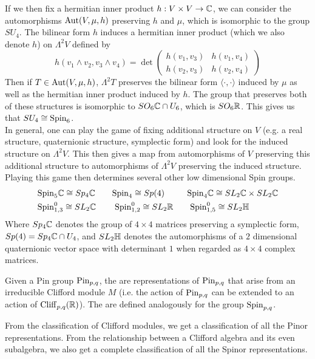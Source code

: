 If we then fix a hermitian inner product $h : V \times V \to \mathbb{C}$, we can
consider the automorphisms $\operatorname{Aut}(V, \mu, h)$ preserving $h$ and $\mu$, which
is isomorphic to the group $SU_4$. The bilinear form $h$ induces a hermitian
inner product (which we also denote $h$) on $\Lambda^2V$ defined by
\[
h(v_1 \wedge v_2, v_3 \wedge v_4) = \det \begin{pmatrix}
h(v_1,v_3) & h(v_1, v_4) \\
h(v_2,v_3) & h(v_2,v_4)
\end{pmatrix}
\]
Then if $T \in \operatorname{Aut}(V,\mu,h)$, $\Lambda^2T$ preserves the bilinear form
$\langle\cdot,\cdot\rangle$ induced by $\mu$ as well as the hermitian inner
product induced by $h$. The group that preserves both of these structures
is isomorphic to $SO_6\mathbb{C} \cap U_6$, which is $SO_6\mathbb{R}$. This gives us that
$SU_4 \cong \mathrm{Spin}_6$. \\

In general, one can play the game of fixing additional structure on $V$
(e.g. a real structure, quaternionic structure, symplectic form) and look
for the induced structure on $\Lambda^2V$. This then gives a map from
automorphisms of $V$ preserving this additional structure to automorphisms
of $\Lambda^2V$ preserving the induced structure. Playing this game then
determines several other low dimensional Spin groups.
%
\begin{align*}
&\mathrm{Spin}_5\mathbb{C} \cong Sp_4\mathbb{C} \qquad\mathrm{Spin}_4 \cong Sp(4)
\qquad\:\:\:\mathrm{Spin}_4\mathbb{C} \cong SL_2\mathbb{C} \times
SL_2\mathbb{C} \\
&\mathrm{Spin}_{1,3}^0 \cong SL_2\mathbb{C} \qquad\: \mathrm{Spin}_{1,2}^0 \cong SL_2\mathbb{R}
\qquad\mathrm{Spin}_{1,5}^0 \cong SL_2\mathbb{H}
\end{align*}
%
Where $Sp_4\mathbb{C}$ denotes the group of $4\times4$ matrices preserving a symplectic
form, $Sp(4) = Sp_4\mathbb{C} \cap U_4$, and $SL_2\mathbb{H}$ denotes the automorphisms of a
$2$ dimensional quaternionic vector space with determinant $1$ when regarded
as $4 \times 4$ complex matrices.
%
\begin{defn}
Given a Pin group $\mathrm{Pin}_{p,q}$, the  are representations
of $\mathrm{Pin}_{p,q}$ that arise from an irreducible Clifford module $M$ (i.e. the
action of $\mathrm{Pin}_{p,q}$ can be extended to an action of $\operatorname{Cliff}_{p,q}(\mathbb{R})$). The
 are defined analogously for the group $\mathrm{Spin}_{p,q}$.
\end{defn}
%
From the classification of Clifford modules, we get a classification of
all the Pinor representations. From the relationship between a Clifford
algebra and its even subalgebra, we also get a complete classification of all
the Spinor representations.
%
